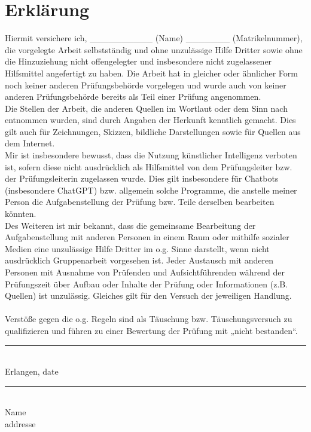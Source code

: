 \chapter*{Erklärung}
\thispagestyle{empty}
\noindent
%
Hiermit versichere ich, \_\_\_\_\_\_\_\_\_\_ (Name) \_\_\_\_\_\_\_ (Matrikelnummer), die vorgelegte Arbeit selbstständig und ohne unzulässige Hilfe Dritter sowie ohne die Hinzuziehung nicht offengelegter und insbesondere nicht zugelassener Hilfsmittel angefertigt zu haben. Die Arbeit hat in gleicher oder ähnlicher Form noch keiner anderen Prüfungsbehörde vorgelegen und wurde auch von keiner anderen Prüfungsbehörde bereits als Teil einer Prüfung angenommen.
\\
Die Stellen der Arbeit, die anderen Quellen im Wortlaut oder dem Sinn nach entnommen wurden, sind durch Angaben der Herkunft kenntlich gemacht. Dies gilt auch für Zeichnungen, Skizzen, bildliche Darstellungen sowie für Quellen aus dem Internet.
\\
Mir ist insbesondere bewusst, dass die Nutzung künstlicher Intelligenz verboten ist, sofern diese nicht ausdrücklich als Hilfsmittel von dem Prüfungsleiter bzw. der Prüfungsleiterin zugelassen wurde. Dies gilt insbesondere für Chatbots (insbesondere ChatGPT) bzw. allgemein solche Programme, die anstelle meiner Person die Aufgabenstellung der Prüfung bzw. Teile derselben bearbeiten könnten.
\\
Des Weiteren ist mir bekannt, dass die gemeinsame Bearbeitung der Aufgabenstellung mit anderen Personen in einem Raum oder mithilfe sozialer Medien eine unzulässige Hilfe Dritter im o.g. Sinne darstellt, wenn nicht ausdrücklich Gruppenarbeit vorgesehen ist. Jeder Austausch mit anderen Personen mit Ausnahme von Prüfenden und Aufsichtführenden während der Prüfungszeit über Aufbau oder Inhalte der Prüfung oder Informationen (z.B. Quellen) ist unzulässig. Gleiches gilt für den Versuch der jeweiligen Handlung.
\\
\\
Verstöße gegen die o.g. Regeln sind als Täuschung bzw. Täuschungsversuch zu qualifizieren und führen zu einer Bewertung der Prüfung mit „nicht bestanden“.
%
\vspace{2cm}
\\
\begin{minipage}[t]{0.45\textwidth}
    \rule{\textwidth}{0.5pt}\\
	Erlangen, date
\end{minipage}
\hfill
\begin{minipage}[t]{0.45\textwidth}
	\rule{\textwidth}{0.5pt}\\
	Name\\
    addresse\\
\end{minipage}
